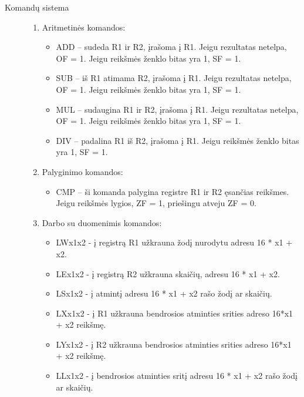 \begin{description}
\item[Komandų sistema] \leavevmode 
\begin{enumerate}
\item Aritmetinės komandos: \leavevmode 
\begin{itemize}
\item ADD – sudeda R1 ir R2, įrašoma į R1. Jeigu rezultatas netelpa, OF = 1. Jeigu reikšmės ženklo bitas yra 1, SF = 1.
\item SUB – iš R1 atimama R2, įrašoma į R1. Jeigu rezultatas netelpa, OF = 1. Jeigu reikšmės ženklo bitas yra 1, SF = 1.
\item MUL – sudaugina R1 ir R2, įrašoma į R1. Jeigu rezultatas netelpa, OF = 1. Jeigu reikšmės ženklo bitas yra 1, SF = 1.
\item DIV – padalina R1 iš R2, įrašoma į R1. Jeigu reikšmės ženklo bitas yra 1, SF = 1.
\end{itemize}
\item Palyginimo komandos:
\begin{itemize}
\item CMP – ši komanda palygina registre R1 ir R2 ęsančias reikšmes. Jeigu reikšmės lygios, ZF = 1, priešingu atveju ZF = 0.
\end{itemize}
\item  Darbo su duomenimis komandos:
\begin{itemize}
\item LWx1x2 - į registrą R1 užkrauna žodį nurodytu adresu 16 * x1 + x2.
\item LEx1x2 -  į registrą R2 užkrauna skaičių, adresu 16 * x1 + x2.
\item LSx1x2 -  į atmintį  adresu 16 * x1 + x2 rašo žodį ar skaičių.

\item LXx1x2 - į R1 užkrauna bendrosios atminties srities adreso 16*x1 + x2 reikšmę.
\item LYx1x2 - į R2 užkrauna bendrosios atminties srities adreso 16*x1 + x2 reikšmę.
\item LLx1x2 -  į bendrosios atminties sritį adresu 16 * x1 + x2 rašo žodį ar skaičių.


\end{itemize}
\end{enumerate}
\end{description}
